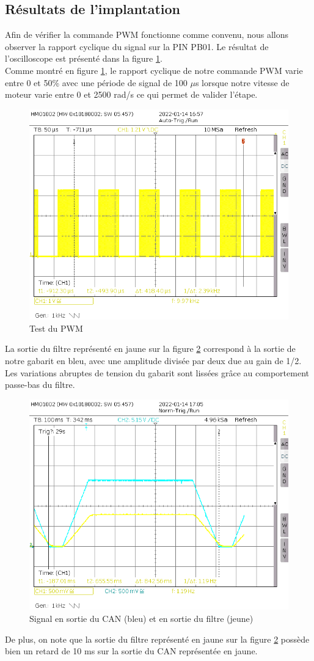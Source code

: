 \documentclass[a4paper]{article}
\begin{document}
\subsection{Résultats de l’implantation}
    Afin de vérifier la commande PWM fonctionne comme convenu, nous allons observer la rapport cyclique du signal sur la PIN PB01. Le résultat de l'oscilloscope est présenté dans la figure \ref{pic_PWM}.~~\\
    Comme montré en figure \ref{pic_PWM}, le rapport cyclique de notre commande PWM varie entre 0 et 50\% avec une période de signal de 100 $\mu$s lorsque notre vitesse de moteur varie entre 0 et 2500 rad/s ce qui permet de valider l'étape.\\
    \begin{figure}[H]
	\centering
	\includegraphics[width=0.7\linewidth]{test_PWM.PNG}
	\caption{Test du PWM}
	\label{pic_PWM}
    \end{figure}
    \newpage
    La sortie du filtre représenté en jaune sur la figure \ref{pic_att} correspond à la sortie de notre gabarit en bleu, avec une amplitude divisée par deux due au gain de 1/2. Les variations abruptes de tension du gabarit sont lissées grâce au comportement passe-bas du filtre.~~\\
    \begin{figure}[H]
	\centering
	\includegraphics[width=0.7\linewidth]{gabarit_filtre.PNG}
	\caption{Signal en sortie du CAN (bleu) et en sortie du filtre (jeune)}
	\label{pic_att}
    \end{figure}  
    De plus, on note que la sortie du filtre représenté en jaune sur la figure \ref{pic_att} possède bien un retard de 10 ms sur la sortie du CAN représentée en jaune.
    
\end{document}
